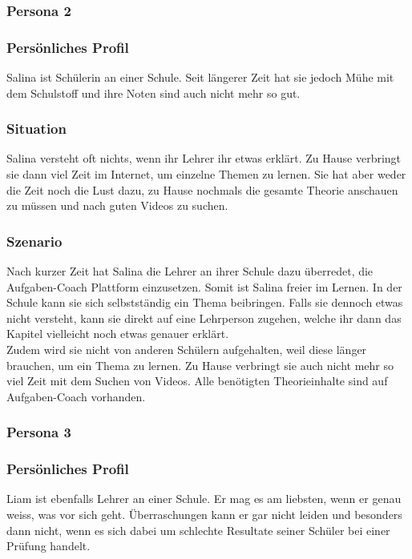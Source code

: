 \subsubsection{Persona 2}
\subsubsection*{Persönliches Profil}
Salina ist Schülerin an einer Schule. Seit längerer Zeit hat sie jedoch Mühe mit dem Schulstoff und ihre Noten sind auch nicht mehr so gut.

\subsubsection*{Situation}
Salina versteht oft nichts, wenn ihr Lehrer ihr etwas erklärt. Zu Hause verbringt sie dann viel Zeit im Internet, um einzelne Themen zu lernen. Sie hat aber weder die Zeit noch die Lust dazu, zu Hause nochmals die gesamte Theorie anschauen zu müssen und nach guten Videos zu suchen.

\subsubsection*{Szenario}
Nach kurzer Zeit hat Salina die Lehrer an ihrer Schule dazu überredet, die Aufgaben-Coach Plattform einzusetzen. Somit ist Salina freier im Lernen. In der Schule kann sie sich selbstständig ein Thema beibringen. Falls sie dennoch etwas nicht versteht, kann sie direkt auf eine Lehrperson zugehen, welche ihr dann das Kapitel vielleicht noch etwas genauer erklärt. \\
Zudem wird sie nicht von anderen Schülern aufgehalten, weil diese länger brauchen, um ein Thema zu lernen. Zu Hause verbringt sie auch nicht mehr so viel Zeit mit dem Suchen von Videos. Alle benötigten Theorieinhalte sind auf Aufgaben-Coach vorhanden.

\subsubsection{Persona 3}
\subsubsection*{Persönliches Profil}
Liam ist ebenfalls Lehrer an einer Schule. Er mag es am liebsten, wenn er genau weiss, was vor sich geht. Überraschungen kann er gar nicht leiden und besonders dann nicht, wenn es sich dabei um schlechte Resultate seiner Schüler bei einer Prüfung handelt.

